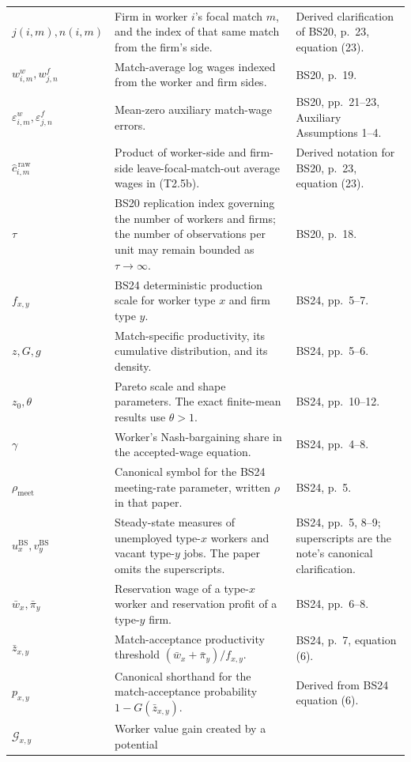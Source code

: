\documentclass[11pt]{article}
\begin{document}
\begin{longtable}{p{}p{}p{}}
\(j(i,m),n(i,m)\) & Firm in worker \(i\)'s focal match \(m\), and the index
of that same match from the firm's side. & Derived clarification of BS20,
p.\ 23, equation (23). \\
\(w^w_{i,m},w^f_{j,n}\) & Match-average log wages indexed from the worker
and firm sides. & BS20, p.\ 19. \\
\(\varepsilon^w_{i,m},\varepsilon^f_{j,n}\) & Mean-zero auxiliary
match-wage errors. & BS20, pp.\ 21--23, Auxiliary Assumptions 1--4. \\
\(\widehat c_{i,m}^{\,\mathrm{raw}}\) & Product of worker-side and firm-side
leave-focal-match-out average wages in (T2.5b). & Derived notation for BS20,
p.\ 23, equation (23). \\
\(\tau\) & BS20 replication index governing the number of workers and firms;
the number of observations per unit may remain bounded as
\(\tau\to\infty\). & BS20, p.\ 18. \\
\(f_{x,y}\) & BS24 deterministic production scale for worker type \(x\) and
firm type \(y\). & BS24, pp.\ 5--7. \\
\(z,G,g\) & Match-specific productivity, its cumulative distribution, and
its density. & BS24, pp.\ 5--6. \\
\(z_0,\theta\) & Pareto scale and shape parameters.  The exact finite-mean
results use \(\theta>1\). & BS24, pp.\ 10--12. \\
\(\gamma\) & Worker's Nash-bargaining share in the accepted-wage equation. &
BS24, pp.\ 4--8. \\
\(\rho_{\mathrm{meet}}\) & Canonical symbol for the BS24 meeting-rate
parameter, written \(\rho\) in that paper. & BS24, p.\ 5. \\
\(u_x^{\mathrm{BS}},v_y^{\mathrm{BS}}\) & Steady-state measures of
unemployed type-\(x\) workers and vacant type-\(y\) jobs.  The paper omits
the superscripts. & BS24, pp.\ 5, 8--9; superscripts are the note's
canonical clarification. \\
\(\bar w_x,\bar\pi_y\) & Reservation wage of a type-\(x\) worker and
reservation profit of a type-\(y\) firm. & BS24, pp.\ 6--8. \\
\(\bar z_{x,y}\) & Match-acceptance productivity threshold
\((\bar w_x+\bar\pi_y)/f_{x,y}\). & BS24, p.\ 7, equation (6). \\
\(p_{x,y}\) & Canonical shorthand for the match-acceptance probability
\(1-G(\bar z_{x,y})\). & Derived from BS24 equation (6). \\
\(\mathcal G_{x,y}\) & Worker value gain created by a potential

\end{longtable}
\end{document}
